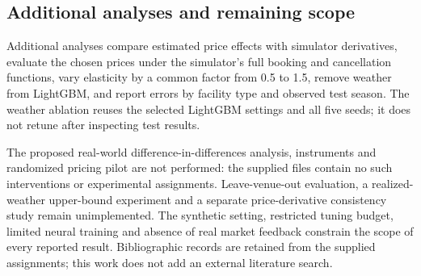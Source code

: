 \subsection{Additional analyses and remaining scope}
Additional analyses compare estimated price effects with simulator derivatives, evaluate the chosen prices under the simulator's full booking and cancellation functions, vary elasticity by a common factor from 0.5 to 1.5, remove weather from LightGBM, and report errors by facility type and observed test season. The weather ablation reuses the selected LightGBM settings and all five seeds; it does not retune after inspecting test results.

The proposed real-world difference-in-differences analysis, instruments and randomized pricing pilot are not performed: the supplied files contain no such interventions or experimental assignments. Leave-venue-out evaluation, a realized-weather upper-bound experiment and a separate price-derivative consistency study remain unimplemented. The synthetic setting, restricted tuning budget, limited neural training and absence of real market feedback constrain the scope of every reported result. Bibliographic records are retained from the supplied assignments; this work does not add an external literature search.
